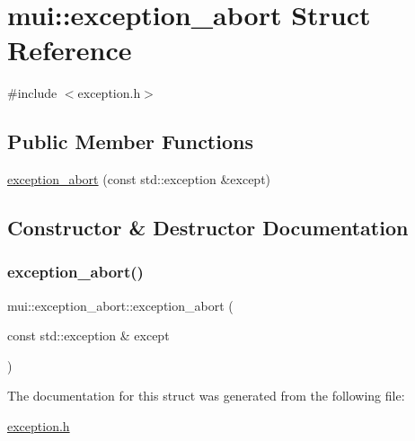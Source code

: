 \hypertarget{structmui_1_1exception__abort}{}\section{mui\+:\+:exception\+\_\+abort Struct Reference}
\label{structmui_1_1exception__abort}


{\ttfamily \#include $<$exception.\+h$>$}

\subsection*{Public Member Functions}
\begin{DoxyCompactItemize}
\item 
\hyperlink{structmui_1_1exception__abort_a6ae2cb4096147601424fbb05463421cc}{exception\+\_\+abort} (const std\+::exception \&except)
\end{DoxyCompactItemize}


\subsection{Constructor \& Destructor Documentation}
\mbox{\label{structmui_1_1exception__abort_a6ae2cb4096147601424fbb05463421cc}} 
\subsubsection{\texorpdfstring{exception\+\_\+abort()}{exception\_abort()}}
{\footnotesize\ttfamily mui\+::exception\+\_\+abort\+::exception\+\_\+abort (\begin{DoxyParamCaption}\item[{const std\+::exception \&}]{except }\end{DoxyParamCaption})\hspace{0.3cm}{\ttfamily [inline]}}



The documentation for this struct was generated from the following file\+:\begin{DoxyCompactItemize}
\item 
\hyperlink{exception_8h}{exception.\+h}\end{DoxyCompactItemize}
